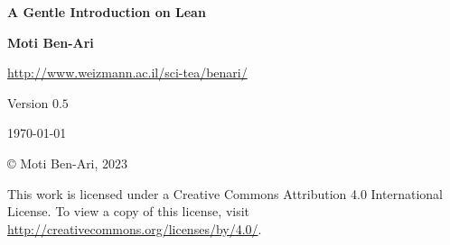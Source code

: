 


\thispagestyle{empty}

\begin{center}
\textbf{\LARGE A Gentle Introduction on Lean}

\bigskip
\bigskip
\bigskip

\textbf{\Large Moti Ben-Ari}

\bigskip

\url{http://www.weizmann.ac.il/sci-tea/benari/}

\bigskip
\bigskip
\bigskip

Version $0.5$

\bigskip

\today

\end{center}

\vfill

\begin{center}
\copyright{} Moti Ben-Ari, $2023$
\end{center}
 
\begin{small}
This work is licensed under a Creative Commons Attribution 4.0 International License. To view a copy of this license, visit \url{http://creativecommons.org/licenses/by/4.0/}.
\end{small}

\newpage

\tableofcontents

\newpage


